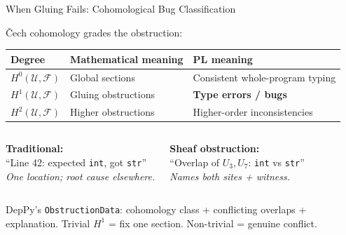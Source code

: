\documentclass[aspectratio=169,10pt]{beamer}
\newcommand{\Sem}{\mathcal{F}}
\begin{document}
\begin{frame}{When Gluing Fails: Cohomological Bug Classification}

\v{C}ech cohomology grades the obstruction:

\vspace{0.2em}
{\small
\begin{tabular}{@{}lll@{}}
\textbf{Degree} & \textbf{Mathematical meaning} & \textbf{PL meaning} \\
\hline
$H^0(\mathcal{U}, \Sem)$ & Global sections & Consistent whole-program typing \\
$H^1(\mathcal{U}, \Sem)$ & Gluing obstructions & \textbf{Type errors / bugs} \\
$H^2(\mathcal{U}, \Sem)$ & Higher obstructions & Higher-order inconsistencies \\
\end{tabular}
}

\vspace{0.3em}
\begin{columns}[T]
\colorbox{tradbox}{\parbox{0.9\textwidth}{\small
\textbf{Traditional:}\\
``Line 42: expected \texttt{int}, got \texttt{str}''\\[2pt]
\emph{One location; root cause elsewhere.}
}}

\colorbox{sheafbox}{\parbox{0.9\textwidth}{\small
\textbf{Sheaf obstruction:}\\
``Overlap of $U_3, U_7$: \texttt{int} vs \texttt{str}''\\[2pt]
\emph{Names both sites + witness.}
}}
\end{columns}

\vspace{0.2em}
{\small DepPy's \texttt{ObstructionData}: cohomology class + conflicting overlaps + explanation.
Trivial $H^1$ = fix one section. Non-trivial = genuine conflict.}

\end{frame}
\end{document}
